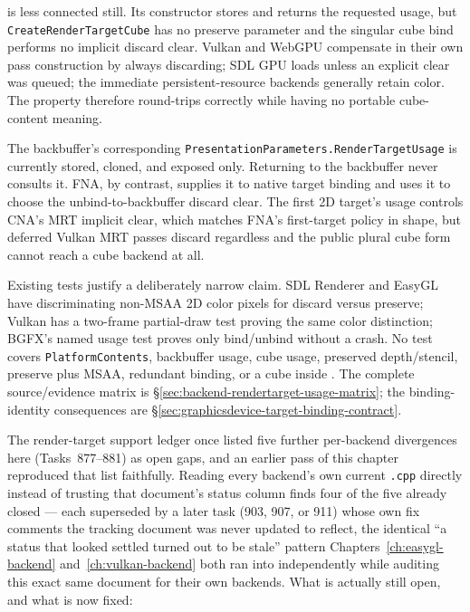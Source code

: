  is less connected still. Its constructor stores and returns the
requested usage, but \texttt{CreateRenderTargetCube} has no preserve parameter and the
singular cube bind performs no implicit discard clear. Vulkan and WebGPU compensate in their
own pass construction by always discarding; SDL GPU loads unless an explicit clear was queued;
the immediate persistent-resource backends generally retain color. The property therefore
round-trips correctly while having no portable cube-content meaning.

The backbuffer's corresponding
\texttt{PresentationParameters.RenderTargetUsage} is currently stored, cloned, and exposed
only. Returning to the backbuffer never consults it. FNA, by contrast, supplies it to native
target binding and uses it to choose the unbind-to-backbuffer discard clear. The first 2D
target's usage controls CNA's MRT implicit clear, which matches FNA's first-target policy in
shape, but deferred Vulkan MRT passes discard regardless and the public plural cube form
cannot reach a cube backend at all.

Existing tests justify a deliberately narrow claim. SDL Renderer and EasyGL have
discriminating non-MSAA 2D color pixels for discard versus preserve; Vulkan has a two-frame
partial-draw test proving the same color distinction; BGFX's named usage test proves only
bind/unbind without a crash. No test covers \texttt{PlatformContents}, backbuffer usage,
cube usage, preserved depth/stencil, preserve plus MSAA, redundant binding, or a cube inside
. The complete source/evidence matrix is
\S\ref{sec:backend-rendertarget-usage-matrix}; the binding-identity consequences are
\S\ref{sec:graphicsdevice-target-binding-contract}.

The render-target support ledger once listed five further per-backend divergences here
(Tasks~877--881) as open gaps, and an earlier pass of this chapter reproduced that list
faithfully. Reading every backend's own current \texttt{.cpp} directly instead of trusting that
document's status column finds four of the five already closed --- each superseded by a later
task (903, 907, or 911) whose own fix comments the tracking document
was never updated to reflect, the identical ``a status that looked settled turned out to be
stale'' pattern Chapters~\ref{ch:easygl-backend} and~\ref{ch:vulkan-backend} both ran into
independently while auditing this exact same document for their own backends. What is actually
still open, and what is now fixed:

